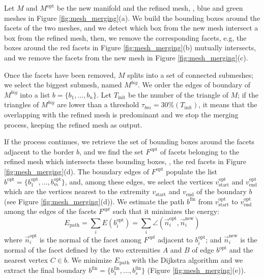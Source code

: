 Let $\mathit{M}$ and  $\mathit{M}^{\text{opt}}$ be the new manifold and the refined mesh, \eg, blue and green meshes in Figure \ref{fig:mesh_merging}(a). 
We build the bounding boxes around the facets of the two meshes, and we detect which box from the new mesh intersect a box from the refined mesh, then, we remove the corresponding facets, e.g, the boxes around the red facets in Figure \ref{fig:mesh_merging}(b) mutually intersects, and we remove the facets from the new mesh in Figure \ref{fig:mesh_merging}(c).

Once the facets have been removed, $\mathit{M}$ splits into a set of connected submeshes; we select the biggest submesh, named  $\mathit{{M}^{big}}$.
We order the edges of boundary of $\mathit{{M}^{big}}$ into a list $\mathit{b} = \{b_1, \dots,  b_n\}$.
Let $T_{\text{init}}$ be the number of the triangle of  $\mathit{M}$; if the triangles of $\mathit{{M}^{big}}$ are lower than a threshold $\tau_{bm}=30\% (T_{\text{init}})$, it means that the overlapping with the refined mesh is predominant and we stop the merging process, keeping the refined mesh as output.

If the process continues, we retrieve the set of bounding boxes around the facets adjacent to the border $\mathit{b}$, and we find the set $\mathit{F}^{\text{opt}}$ of facets  belonging to the refined mesh which intersects these bounding boxes, \eg, the red facets  in Figure \ref{fig:mesh_merging}(d).
The boundary edges of $\mathit{F}^{\text{opt}}$ populate the list  $\mathit{b}^{\text{opt}} = \{b_1^{\text{opt}}, \dots,  b_m^{\text{opt}}\}$, and, among these edges, we select the vertices  $v_{\text{start}}^{\text{opt}}$ and $v_{\text{end}}^{\text{opt}}$ which are the vertices nearest to the extremity $v_{\text{start}}$ and  $v_{\text{end}}$ of the boundary $\mathit{b}$ (see Figure \ref{fig:mesh_merging}(d)). 
We estimate the path  $\mathit{b}^{\text{fin}}$ from $v_{\text{start}}^{\text{opt}}$ to $v_{\text{end}}^{\text{opt}}$ among the edges of the facets  $\mathit{F}^{opt}$ such that it minimizes the energy:
\begin{equation}
  E_{\text{path}} = \sum_i E(b_i^{\text{opt}})= \sum_i \angle (\overrightarrow{n}_i^{\text{opt}},\overrightarrow{n}_i^{\text{new}})
\end{equation}
where $\overrightarrow{n}_i^{\text{opt}}$ is the normal of the facet among $\mathit{F}^{opt}$ adjacent to  $b_i^{\text{opt}}$; and
$\overrightarrow{n}_i^{\text{new}}$ is the normal of the facet defined by the two extremities $A$ and $B$ of edge ${b}^{\text{opt}}$ and the nearest vertex $C \in \mathit{b}$.
We minimize $E_{\text{path}}$ with the Dijkstra algorithm  and we extract the final boundary $\mathit{b}^{\text{fin}} = \{ b_1^{\text{fin}}, \dots, b_s^{\text{fin}}\}$ (Figure \ref{fig:mesh_merging}(e)).

